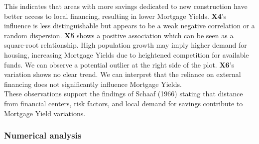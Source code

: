 \documentclass[
  12pt,
]{article}
\begin{document}
This indicates that areas with more savings dedicated to new
construction have better access to local financing, resulting in lower
Mortgage Yields. \textbf{X4}'s influence is less distinguishable but
appears to be a weak negative correlation or a random dispersion.
\textbf{X5} shows a positive association which can be seen as a
square-root relationship. High population growth may imply higher demand
for housing, increasing Mortgage Yields due to heightened competition
for available funds. We can observe a potential outlier at the right
side of the plot. \textbf{X6}'s variation shows no clear trend. We can
interpret that the reliance on external financing does not significantly
influence Mortgage Yields.\\
These observations support the findings of Schaaf (1966) stating that
distance from financial centers, risk factors, and local demand for
savings contribute to Mortgage Yield variations. \vspace{-1em}

\subsubsection{Numerical analysis}\label{numerical-analysis-1}
\end{document}
